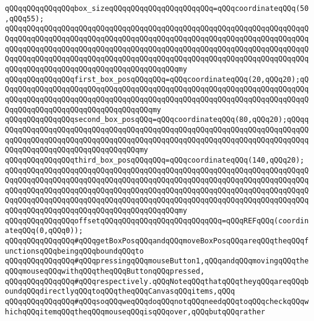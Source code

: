 \verb|qQQqqQQqqQQqqQQqbox_sizeqQQqqQQqqQQqqQQqqQQqqQQq=qQQqcoordinateqQQq(50,qQQq55);|\newline
\verb|qQQqqQQqqQQqqQQqqQQqqQQqqQQqqQQqqQQqqQQqqQQqqQQqqQQqqQQqqQQqqQQqqQQqqQQqqQQqqQQqqQQqqQQqqQQqqQQqqQQqqQQqqQQqqQQqqQQqqQQqqQQqqQQqqQQqqQQqqQQqqQQqqQQqqQQqqQQqqQQqqQQqqQQqqQQqqQQqqQQqqQQqqQQqqQQqqQQqqQQqqQQqqQQqqQQqqQQqqQQqqQQqqQQqqQQqqQQqqQQqqQQqqQQqqQQqqQQqqQQqqQQqqQQqqQQqqQQqqQQqqQQqqQQqqQQqqQQqqQQqqQQqqQQqqQQqqQQqqQQqmy|\newline
\verb|qQQqqQQqqQQqqQQqfirst_box_posqQQqqQQq=qQQqcoordinateqQQq(20,qQQq20);qQQqqQQqqQQqqQQqqQQqqQQqqQQqqQQqqQQqqQQqqQQqqQQqqQQqqQQqqQQqqQQqqQQqqQQqqQQqqQQqqQQqqQQqqQQqqQQqqQQqqQQqqQQqqQQqqQQqqQQqqQQqqQQqqQQqqQQqqQQqqQQqqQQqqQQqqQQqqQQqqQQqqQQqqQQqqQQqmy|\newline
\verb|qQQqqQQqqQQqqQQqsecond_box_posqQQq=qQQqcoordinateqQQq(80,qQQq20);qQQqqQQqqQQqqQQqqQQqqQQqqQQqqQQqqQQqqQQqqQQqqQQqqQQqqQQqqQQqqQQqqQQqqQQqqQQqqQQqqQQqqQQqqQQqqQQqqQQqqQQqqQQqqQQqqQQqqQQqqQQqqQQqqQQqqQQqqQQqqQQqqQQqqQQqqQQqqQQqqQQqqQQqqQQqqQQqmy|\newline
\verb|qQQqqQQqqQQqqQQqthird_box_posqQQqqQQq=qQQqcoordinateqQQq(140,qQQq20);|\newline
\newline
\verb|qQQqqQQqqQQqqQQqqQQqqQQqqQQqqQQqqQQqqQQqqQQqqQQqqQQqqQQqqQQqqQQqqQQqqQQqqQQqqQQqqQQqqQQqqQQqqQQqqQQqqQQqqQQqqQQqqQQqqQQqqQQqqQQqqQQqqQQqqQQqqQQqqQQqqQQqqQQqqQQqqQQqqQQqqQQqqQQqqQQqqQQqqQQqqQQqqQQqqQQqqQQqqQQqqQQqqQQqqQQqqQQqqQQqqQQqqQQqqQQqqQQqqQQqqQQqqQQqqQQqqQQqqQQqqQQqqQQqqQQqqQQqqQQqqQQqqQQqqQQqqQQqqQQqqQQqqQQqqQQqmy|\newline
\verb|qQQqqQQqqQQqqQQqoffsetqQQqqQQqqQQqqQQqqQQqqQQqqQQq=qQQqREFqQQq(coordinateqQQq(0,qQQq0));|\newline
\newline
\newline
\verb|qQQqqQQqqQQqqQQq#qQQqgetBoxPosqQQqandqQQqmoveBoxPosqQQqareqQQqtheqQQqfunctionsqQQqbeingqQQqboundqQQqto|\newline
\verb|qQQqqQQqqQQqqQQq#qQQqpressingqQQqmouseButton1,qQQqandqQQqmovingqQQqtheqQQqmouseqQQqwithqQQqtheqQQqButtonqQQqpressed,|\newline
\verb|qQQqqQQqqQQqqQQq#qQQqrespectively.qQQqNoteqQQqthatqQQqtheyqQQqareqQQqboundqQQqdirectlyqQQqtoqQQqtheqQQqCanvasqQQqitems,qQQq|\newline
\verb|qQQqqQQqqQQqqQQq#qQQqsoqQQqweqQQqdoqQQqnotqQQqneedqQQqtoqQQqcheckqQQqwhichqQQqitemqQQqtheqQQqmouseqQQqisqQQqover,qQQqbutqQQqrather|\newline

